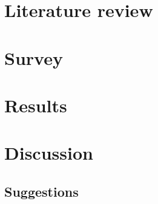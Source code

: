 \documentclass[utf8,english]{gradu3}
\begin{document}
\chapter{Literature review}
\label{literatureReview}



\chapter{Survey}
\label{vca}


\chapter{Results}
\label{results}



\chapter{Discussion}
\label{discussion}

\section{Suggestions}


%
%
%





\end{document}
